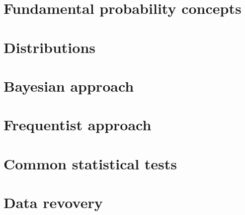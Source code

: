 \chapter{Fundamental probability concepts}


\chapter{Distributions}


\chapter{Bayesian approach}


\chapter{Frequentist approach}


\chapter{Common statistical tests}


\chapter{Data revovery}

